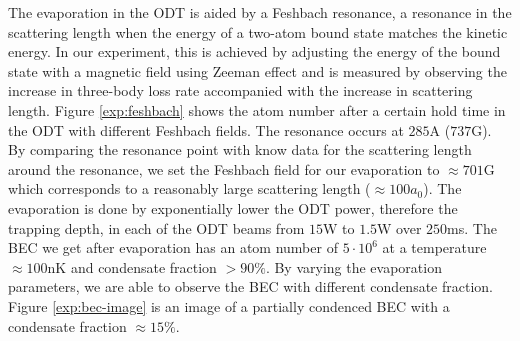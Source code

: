 The evaporation in the ODT is aided by a Feshbach resonance, a resonance in the scattering length when the energy of a two-atom bound state matches the kinetic energy. In our experiment, this is achieved by adjusting the energy of the bound state with a magnetic field using Zeeman effect and is measured by observing the increase in three-body loss rate accompanied with the increase in scattering length. Figure \ref{exp:feshbach} shows the atom number after a certain hold time in the ODT with different Feshbach fields. The resonance occurs at $285$A ($737$G). By comparing the resonance point with know data for the scattering length around the resonance, we set the Feshbach field for our evaporation to $\approx701$G which corresponds to a reasonably large scattering length ($\approx100a_0$). The evaporation is done by exponentially lower the ODT power, therefore the trapping depth, in each of the ODT beams from $15$W to $1.5$W over $250$ms. The BEC we get after evaporation has an atom number of $5\cdot10^{6}$ at a temperature $\approx100$nK and condensate fraction $>90\%$. By varying the evaporation parameters, we are able to observe the BEC with different condensate fraction. Figure \ref{exp:bec-image} is an image of a partially condenced BEC with a condensate fraction $\approx15\%$.
